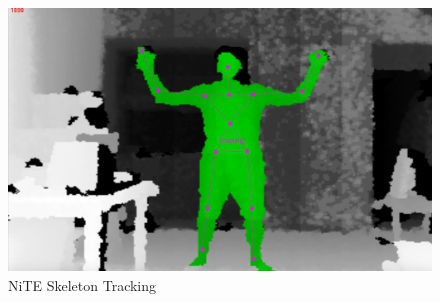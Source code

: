 \begin{figure}
	[h] \centering 
	\includegraphics[height=7cm]{figures/content/ni-skeleton.png} \caption{NiTE Skeleton Tracking} \label{fg:ni:skeleton} 
\end{figure}